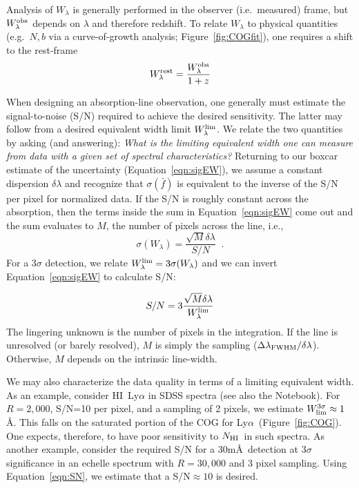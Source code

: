 \documentclass[graybox]{svmult}
\newcommand{\HI}{H{\sc I}}
\def\lya{Ly$\alpha$}
\newcommand{\mnhi}{N_{\rm HI}}
\newcommand{\nhi}{$\mnhi$}
\begin{document}
Analysis of $W_\lambda$ is 
generally performed in the observer (i.e.\ measured) frame,
but $W_\lambda^{\rm obs}$ depends on $\lambda$ and therefore redshift.
To relate $W_\lambda$ to physical quantities (e.g.\ $N,b$ via a
curve-of-growth analysis; Figure~\ref{fig:COGfit}),  one requires a shift to the rest-frame
\begin{equation}
W_\lambda^{\rm rest} = \frac{W_\lambda^{\rm obs}}{1+z}
\end{equation}

When designing an absorption-line observation, one generally
must estimate the signal-to-noise (S/N) required to achieve
the desired sensitivity.   The latter may follow from a
desired equivalent width limit $W_\lambda^{\rm lim}$.
We relate the two quantities by asking (and answering):
{\it What is the limiting equivalent width one can measure from
data with a given set of spectral characteristics?}
Returning to our boxcar estimate of the uncertainty 
(Equation~\ref{eqn:sigEW}), we 
assume a constant dispersion $\delta\lambda$ and
recognize that $\sigma(\bar f)$ is equivalent to 
the inverse of the S/N per pixel for normalized data.
If the S/N is roughly constant across the absorption,
then the terms inside the sum in Equation~\ref{eqn:sigEW}
come out and the sum evaluates to $M$, the number of pixels
across the line, i.e.,
\begin{equation}
\sigma(W_\lambda) = \frac{\sqrt{M} \delta\lambda}{S/N} \;\; .
\label{eqn:sigSN}
\end{equation}
For a $3\sigma$ detection, we relate 
$W_\lambda^{\rm lim} = 3 \sigma(W_\lambda)$ and we can invert
Equation~\ref{eqn:sigEW} to calculate S/N:

\begin{equation}
S/N = 3 \frac{\sqrt{M} \delta\lambda}{W_\lambda^{\rm lim}}
\label{eqn:SN}
\end{equation}
The lingering unknown is the number of pixels in the
integration.
If the line is unresolved (or barely resolved), 
$M$ is simply the sampling ($\Delta\lambda_{\rm FWHM} / \delta\lambda$).
Otherwise, $M$ depends on the intrinsic line-width. 

We may also characterize the data quality in terms of a
limiting equivalent width.  As an example, consider 
\HI\ Ly$\alpha$ in SDSS spectra (see also the Notebook).
For $R=2,000$, S/N=10 per pixel, and a sampling of 2 pixels,
we estimate  $W_{\rm lim}^{3\sigma} \approx 1$\AA.
This falls on the saturated portion of the COG for \lya\
(Figure~\ref{fig:COG}).  One expects, therefore,
to have  poor sensitivity to \nhi\ in such spectra. 
As another example, consider the required S/N for a 
30m\AA\ detection at $3\sigma$ significance in an echelle
spectrum with $R=30,000$ and 3 pixel sampling.  Using
Equation~\ref{eqn:SN}, we estimate that a 
S/N$\approx 10$ is desired.
\end{document}
